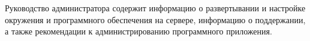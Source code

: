 
Руководство администратора содержит информацию о развертывании и настройке окружения и программного обеспечения на сервере, информацию о поддержании, а также рекомендации к администрированию программного приложения.

\clearpage